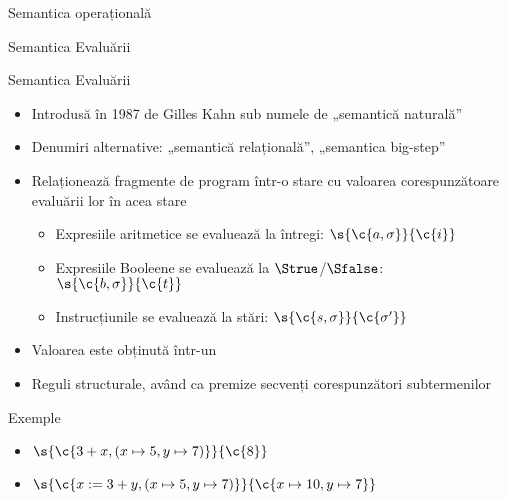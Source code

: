 \documentclass[xcolor=pdftex,romanian,colorlinks]{beamer}
\begin{document}
\begin{section}{Semantica operațională}
\begin{subsection}{Semantica Evaluării}
\begin{frame}{Semantica Evaluării}
\begin{itemize}
\item Introdusă în 1987 de Gilles Kahn sub numele de „semantică naturală”
\item Denumiri alternative: „semantică relațională”, „semantica big-step”
\item Relaționează fragmente de program într-o stare  cu valoarea corespunzătoare evaluării lor în acea stare
\begin{itemize}
\item Expresiile aritmetice se evaluează la întregi: $\s{\c{a,\sigma}}{\c{i}}$
\item Expresiile Booleene se evaluează la $\Strue$/$\Sfalse$: $\s{\c{b,\sigma}}{\c{t}}$
\item Instrucțiunile se evaluează la stări: $\s{\c{s,\sigma}}{\c{\sigma'}}$
\end{itemize}
\item Valoarea este obținută într-un 
\item Reguli structurale, având ca premize secvenți corespunzători subtermenilor
\end{itemize}

\begin{block}{Exemple}
\begin{itemize}
\item $\s{\c{3 + x, (x\mapsto 5, y\mapsto 7)}}{\c{8}}$
\item $\s{\c{x := 3 + y, (x\mapsto 5, y\mapsto 7)}}{\c{x\mapsto 10, y\mapsto 7}}$
\end{itemize}
\end{block}
\end{frame}


\end{subsection}
\end{section}
\end{document}
